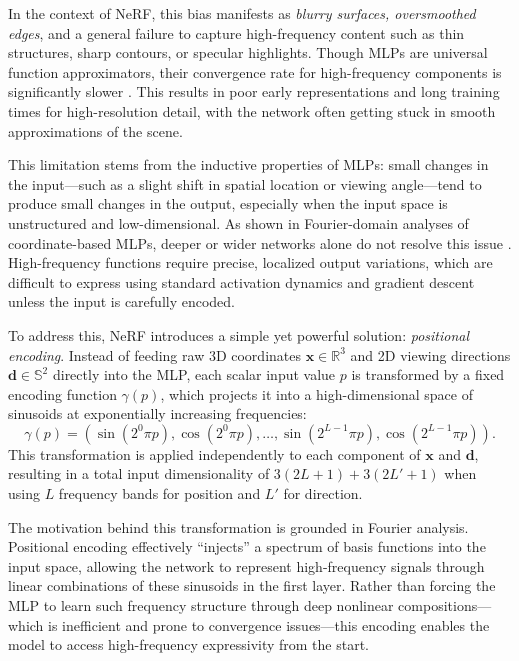 In the context of NeRF, this bias manifests as \emph{blurry surfaces, oversmoothed edges}, and a general failure to capture high-frequency content such as thin structures, sharp contours, or specular highlights. Though MLPs are universal function approximators, their convergence rate for high-frequency components is significantly slower \cite{ramasinghe2022_coordmlp}. This results in poor early representations and long training times for high-resolution detail, with the network often getting stuck in smooth approximations of the scene.

This limitation stems from the inductive properties of MLPs: small changes in the input—such as a slight shift in spatial location or viewing angle—tend to produce small changes in the output, especially when the input space is unstructured and low-dimensional. As shown in Fourier-domain analyses of coordinate-based MLPs, deeper or wider networks alone do not resolve this issue \cite{rahaman2019_spectralbias, ramasinghe2022_coordmlp}. High-frequency functions require precise, localized output variations, which are difficult to express using standard activation dynamics and gradient descent unless the input is carefully encoded.

To address this, NeRF introduces a simple yet powerful solution: \emph{positional encoding}. Instead of feeding raw 3D coordinates \( \mathbf{x} \in \mathbb{R}^3 \) and 2D viewing directions \( \mathbf{d} \in \mathbb{S}^2 \) directly into the MLP, each scalar input value \( p \) is transformed by a fixed encoding function \( \gamma(p) \), which projects it into a high-dimensional space of sinusoids at exponentially increasing frequencies:
\[
\gamma(p) = \left( \sin(2^0 \pi p), \cos(2^0 \pi p), \ldots, \sin(2^{L-1} \pi p), \cos(2^{L-1} \pi p) \right).
\]
This transformation is applied independently to each component of \( \mathbf{x} \) and \( \mathbf{d} \), resulting in a total input dimensionality of \( 3(2L + 1) + 3(2L' + 1) \) when using \( L \) frequency bands for position and \( L' \) for direction.

The motivation behind this transformation is grounded in Fourier analysis. Positional encoding effectively “injects” a spectrum of basis functions into the input space, allowing the network to represent high-frequency signals through linear combinations of these sinusoids in the first layer. Rather than forcing the MLP to learn such frequency structure through deep nonlinear compositions—which is inefficient and prone to convergence issues—this encoding enables the model to access high-frequency expressivity from the start.

